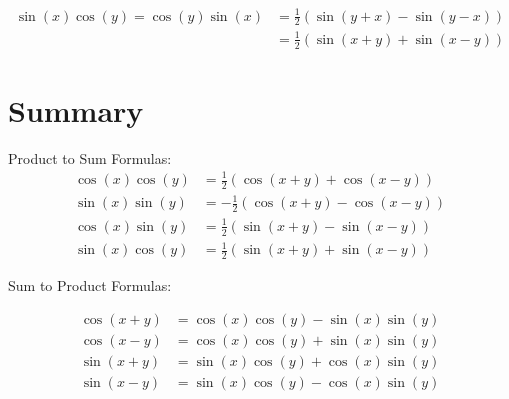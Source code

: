 \documentclass[12pt]{article}
\begin{document}
\begin{align}
\sin(x)\cos(y) = \cos(y)\sin(x) &= \frac{1}{2} \left(\sin(y+x) - \sin(y-x)\right)\\
&= \frac{1}{2} \left(\sin(x+y) + \sin(x-y)\right)
\end{align}

\section{Summary}

Product to Sum Formulas:
\begin{align}
\cos(x)\cos(y) &= \frac{1}{2}\left(\cos(x+y) + \cos(x-y)\right)\\
\sin(x)\sin(y) &= -\frac{1}{2}\left(\cos(x+y) - \cos(x-y)\right)\\
\cos(x)\sin(y) &= \frac{1}{2}\left(\sin(x+y) - \sin(x-y)\right)\\
\sin(x)\cos(y) &= \frac{1}{2}\left(\sin(x+y) + \sin(x-y)\right)
\end{align}

Sum to Product Formulas:

\begin{align}
\cos(x+y) &= \cos(x)\cos(y) - \sin(x)\sin(y)\\
\cos(x-y) &= \cos(x)\cos(y) + \sin(x)\sin(y)\\
\sin(x+y) &= \sin(x)\cos(y) + \cos(x)\sin(y)\\
\sin(x-y) &= \sin(x)\cos(y) - \cos(x)\sin(y)
\end{align}
\end{document}
